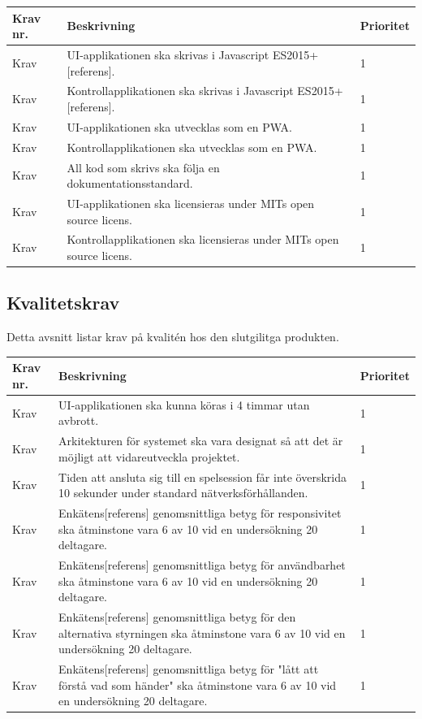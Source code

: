 \documentclass[10pt]{article}
\newcounter{indexcounter}
\newcommand{\Krav}[2]{
	\stepcounter{indexcounter}
	Krav \arabic{indexcounter} & #1 & #2 \\ \hline
}
\begin{document}
	\begin{tabular}{| p{2cm} | p{8cm} | p{2cm}|}
		\hline
		\textbf{Krav nr.} & \textbf{Beskrivning} & \textbf{Prioritet} \\ \hline
		
		\Krav{UI-applikationen ska skrivas i Javascript ES2015+[referens].}{1}
		\Krav{Kontrollapplikationen ska skrivas i Javascript ES2015+[referens].}{1}
		\Krav{UI-applikationen ska utvecklas som en PWA.}{1}
		\Krav{Kontrollapplikationen ska utvecklas som en PWA.}{1}
		\Krav{All kod som skrivs ska följa en dokumentationsstandard.}{1}
		\Krav{UI-applikationen ska licensieras under MITs open source licens.}{1}
		\Krav{Kontrollapplikationen ska licensieras under MITs open source licens.}{1}
		
	\end{tabular}

	\subsection{Kvalitetskrav}
	Detta avsnitt listar krav på kvalitén hos den slutgilitga produkten.
	
		\begin{tabular}{|p{2cm}|p{8cm}|p{2cm}|}
		\hline
		\textbf{Krav nr.} & \textbf{Beskrivning} & \textbf{Prioritet} \\ \hline
		
		\Krav{UI-applikationen ska kunna köras i 4 timmar utan avbrott.}{1}
		\Krav{Arkitekturen för systemet ska vara designat så att det är möjligt att vidareutveckla projektet.}{1}
		\Krav{Tiden att ansluta sig till en spelsession får inte överskrida 10 sekunder under standard nätverksförhållanden.}{1}
		\Krav{Enkätens[referens] genomsnittliga betyg för responsivitet ska åtminstone vara 6 av 10 vid en undersökning 20 deltagare.}{1}
		\Krav{Enkätens[referens] genomsnittliga betyg för användbarhet ska åtminstone vara 6 av 10 vid en undersökning 20 deltagare.}{1}
		\Krav{Enkätens[referens] genomsnittliga betyg för den alternativa styrningen ska åtminstone vara 6 av 10 vid en undersökning 20 deltagare.}{1}
		\Krav{Enkätens[referens] genomsnittliga betyg för "lått att förstå vad som händer" ska åtminstone vara 6 av 10 vid en undersökning 20 deltagare.}{1}
				
	\end{tabular}
	
\pagebreak

\printbibliography
{}
\end{document}
